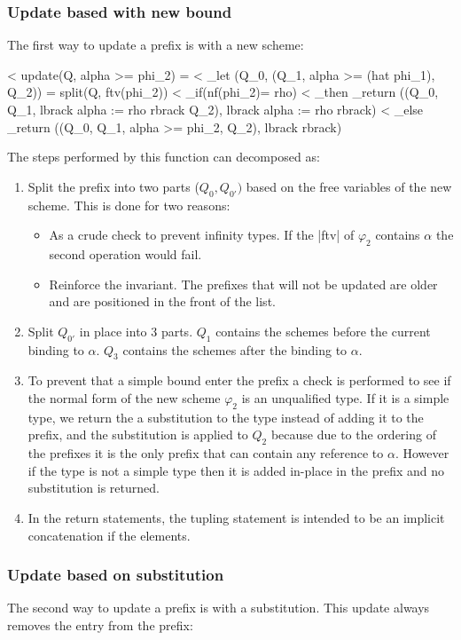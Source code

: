 \subsubsection{Update based with new bound}
The first way to update a prefix is with a new scheme:


< update(Q, alpha >= phi_2) =
<    _let (Q_0, (Q_1, alpha >= (hat phi_1), Q_2)) = split(Q, ftv(phi_2))
<               _if(nf(phi_2)= rho)
<                   _then  _return ((Q_0, Q_1, lbrack alpha := rho rbrack Q_2), lbrack alpha := rho rbrack)
<                   _else  _return ((Q_0, Q_1, alpha >= phi_2, Q_2), lbrack rbrack)

The steps performed by this function can decomposed as:

\begin{enumerate}
\item{ Split the prefix into two parts ($Q_0, Q_{0'})$ based on the free variables of the new scheme. This is done for two reasons:  
		\begin{itemize}
		\item As a crude check to prevent infinity types. If the |ftv| of $\varphi_2$ contains $\alpha$ the second operation would fail.
		\item Reinforce the invariant. The prefixes that will not be updated are older and are positioned in the front of the list.
		\end{itemize}
     }
\item Split $Q_{0'}$ in place into 3 parts. $Q_1$ contains the schemes before the current binding to $\alpha$. $Q_3$ contains the schemes after the binding to $\alpha$.
\item{ To prevent that a simple bound enter the prefix a check is performed to see if the normal form of the new scheme $\varphi_2$ is an unqualified type. If it is a simple type, we return the a substitution to the type instead of adding it to the prefix, and the substitution is applied to $Q_2$ because due to the ordering of the prefixes it is the only prefix that can contain any reference to $\alpha$.
However if the type is not a simple type then it is added in-place in the prefix and no substitution is returned.
     }
\item In the return statements, the tupling statement is intended to be an implicit concatenation if the elements. 
\end{enumerate}
\subsubsection{Update based on substitution}
The second way to update a prefix is with a substitution. This update always removes the entry from the prefix:

